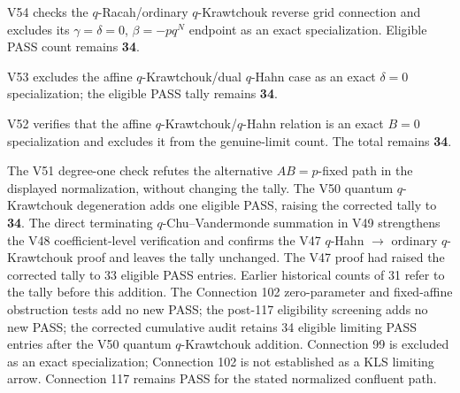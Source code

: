 \documentclass[11pt]{article}
\begin{document}
\noindent V54 checks the $q$-Racah/ordinary $q$-Krawtchouk reverse grid connection and excludes its $\gamma=\delta=0$, $\beta=-pq^N$ endpoint as an exact specialization. Eligible PASS count remains \textbf{34}.\par
\noindent V53 excludes the affine $q$-Krawtchouk/dual $q$-Hahn case as an exact $\delta=0$ specialization; the eligible PASS tally remains \textbf{34}.\par
\noindent V52 verifies that the affine $q$-Krawtchouk/$q$-Hahn relation is an exact $B=0$ specialization and excludes it from the genuine-limit count. The total remains \textbf{34}.\par
\noindent The V51 degree-one check refutes the alternative $AB=p$-fixed path in the displayed normalization, without changing the tally. The V50 quantum $q$-Krawtchouk degeneration adds one eligible PASS, raising the corrected tally to \textbf{34}. The direct terminating $q$-Chu--Vandermonde summation in V49 strengthens the V48 coefficient-level verification and confirms the V47 $q$-Hahn $\to$ ordinary $q$-Krawtchouk proof and leaves the tally unchanged. The V47 proof had raised the corrected tally to 33 eligible PASS entries. Earlier historical counts of 31 refer to the tally before this addition. The Connection 102 zero-parameter and fixed-affine obstruction tests add no new PASS; the post-117 eligibility screening adds no new PASS; the corrected cumulative audit retains 34 eligible limiting PASS entries after the V50 quantum $q$-Krawtchouk addition. Connection 99 is excluded as an exact specialization; Connection 102 is not established as a KLS limiting arrow. Connection 117 remains PASS for the stated normalized confluent path.\par
\end{document}
